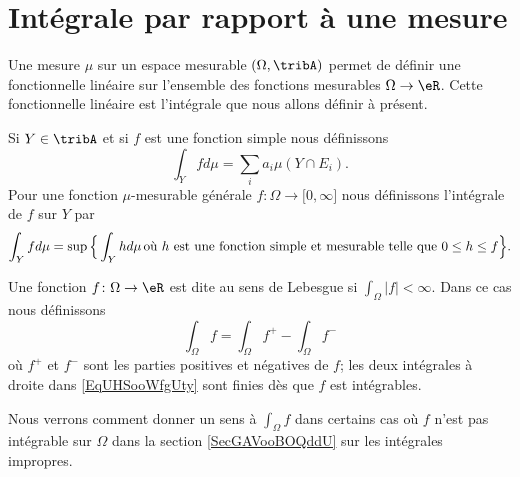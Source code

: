 
\section{Intégrale par rapport à une mesure}

Une mesure \( \mu\) sur un espace mesurable \( (\Omega,\tribA)\) permet de définir une fonctionnelle linéaire sur l'ensemble des fonctions mesurables \( \Omega\to \eR\). Cette fonctionnelle linéaire est l'intégrale que nous allons définir à présent.

\begin{definition}  \label{DefTVOooleEst}
    Si \( Y\in \tribA\) et si \( f\) est une fonction simple nous définissons
    \begin{equation}
        \int_Yfd\mu=\sum_ia_i\mu(Y\cap E_i).
    \end{equation}
    Pour une fonction \( \mu\)-mesurable générale \( f\colon \Omega\to \mathopen[ 0 , \infty \mathclose]\) nous définissons l'intégrale de \( f\) sur \( Y\) par
    \begin{equation}        \label{EqDefintYfdmu}
        \int_Yfd\mu=\sup\Big\{ \int_Yhd\mu\,\text{où \( h\) est une fonction simple et mesurable telle que \( 0\leq h\leq f\)} \Big\}.
    \end{equation}
\end{definition}

\begin{definition}  \label{DefTCXooAstMYl}
    Une fonction \( f\colon \Omega\to \eR\) est dite  au sens de Lebesgue si \( \int_{\Omega}| f |<\infty\). Dans ce cas nous définissons
    \begin{equation}    \label{EqUHSooWfgUty}
        \int_{\Omega}f=\int_{\Omega}f^+-\int_{\Omega}f^-
    \end{equation}
    où \( f^+\) et \( f^-\) sont les parties positives et négatives de \( f\); les deux intégrales à droite dans \eqref{EqUHSooWfgUty} sont finies dès que \( f\) est intégrables.
\end{definition}
Nous verrons comment donner un sens à \( \int_{\Omega}f\) dans certains cas où \( f\) n'est pas intégrable sur \( \Omega\) dans la section \ref{SecGAVooBOQddU} sur les intégrales impropres.

